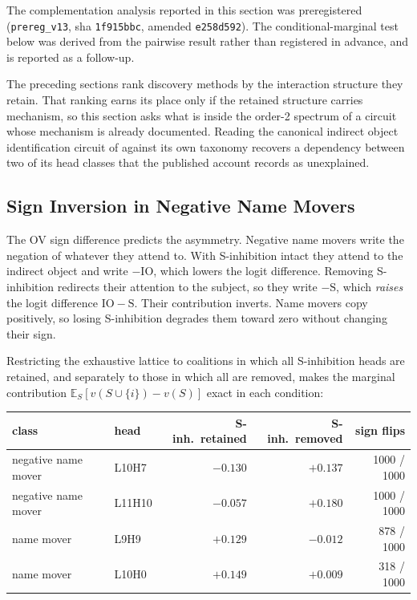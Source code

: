 \documentclass{article}
\begin{document}
The complementation analysis reported in this section was preregistered (\texttt{prereg\_v13}, sha \texttt{1f915bbc}, amended \texttt{e258d592}). The conditional-marginal test below was derived from the pairwise result rather than registered in advance, and is reported as a follow-up.

The preceding sections rank discovery methods by the interaction structure they retain.
That ranking earns its place only if the retained structure carries mechanism, so this
section asks what is inside the order-2 spectrum of a circuit whose mechanism is already
documented. Reading the canonical indirect object identification circuit of
\citet{wang2022ioi} against its own taxonomy recovers a dependency between two of its head
classes that the published account records as unexplained.




\subsection{Sign Inversion in Negative Name Movers}

The OV sign difference predicts the asymmetry. Negative name movers write the negation of
whatever they attend to. With S-inhibition intact they attend to the indirect object and
write $-\mathrm{IO}$, which lowers the logit difference. Removing S-inhibition redirects
their attention to the subject, so they write $-\mathrm{S}$, which \emph{raises} the logit
difference $\mathrm{IO} - \mathrm{S}$. Their contribution inverts. Name movers copy
positively, so losing S-inhibition degrades them toward zero without changing their sign.

Restricting the exhaustive lattice to coalitions in which all S-inhibition heads are retained, and separately to those in which all are removed, makes the marginal contribution $\mathbb{E}_S[v(S \cup \{i\}) - v(S)]$ exact in each condition:

\begin{center}
\begin{tabular}{llrrr}
\toprule
class & head & S-inh.\ retained & S-inh.\ removed & sign flips \\
\midrule
negative name mover & L10H7  & $-0.130$ & $+0.137$ & 1000 / 1000 \\
negative name mover & L11H10 & $-0.057$ & $+0.180$ & 1000 / 1000 \\
name mover          & L9H9   & $+0.129$ & $-0.012$ & 878 / 1000 \\
name mover          & L10H0  & $+0.149$ & $+0.009$ & 318 / 1000 \\
\bottomrule
\end{tabular}
\end{center}
\end{document}
